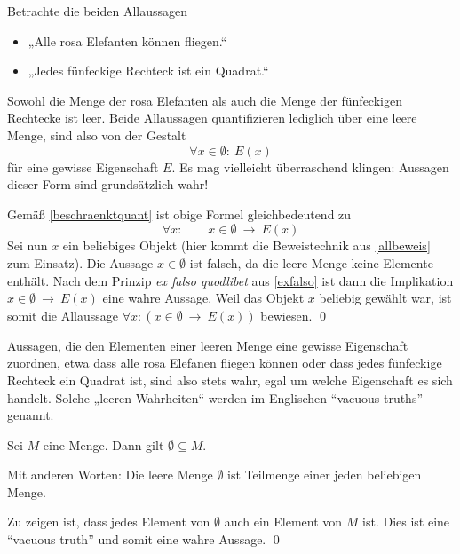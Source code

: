 \begin{bem} \label{vacuoustruth} 
    Betrachte die beiden Allaussagen
    \begin{itemize}
        \item „Alle rosa Elefanten können fliegen.“
        \item „Jedes fünfeckige Rechteck ist ein Quadrat.“
    \end{itemize}	
    Sowohl die Menge der rosa Elefanten als auch die Menge der fünfeckigen Rechtecke ist leer. Beide Allaussagen quantifizieren lediglich über eine leere Menge, sind also von der Gestalt
        \[ \forall x\in \emptyset:\ E(x) \]
    für eine gewisse Eigenschaft $E$. Es mag vielleicht überraschend klingen: Aussagen dieser Form sind grundsätzlich wahr!
    \begin{bew}
        Gemäß \cref{beschraenktquant} ist obige Formel gleichbedeutend zu
            \[ \forall x:\qquad x\in \emptyset\ \to\ E(x) \]
        Sei nun $x$ ein beliebiges Objekt (hier kommt die Beweistechnik aus \cref{allbeweis} zum Einsatz). Die Aussage $x\in\emptyset$ ist falsch, da die leere Menge keine Elemente enthält. Nach dem Prinzip \emph{ex falso quodlibet} aus \cref{exfalso} ist dann die Implikation $x\in \emptyset\ \to\ E(x)$ eine wahre Aussage. Weil das Objekt $x$ beliebig gewählt war, ist somit die Allaussage $\forall x: \left(x\in \emptyset\ \to\ E(x)\right)$ bewiesen. \qed
	\end{bew}
    \noindent Aussagen, die den Elementen einer leeren Menge eine gewisse Eigenschaft zuordnen, etwa dass alle rosa Elefanen fliegen können oder dass jedes fünfeckige Rechteck ein Quadrat ist, sind also stets wahr, egal um welche Eigenschaft es sich handelt. Solche „leeren Wahrheiten“ werden im Englischen ``vacuous truths'' genannt.
\end{bem}


\begin{satz} \label{leeremengeimmerdrin}
    Sei $M$ eine Menge. Dann gilt $\emptyset\subseteq M$.

    Mit anderen Worten: Die leere Menge $\emptyset$ ist Teilmenge einer jeden beliebigen Menge.
\end{satz}


\begin{bew}
    Zu zeigen ist, dass jedes Element von $\emptyset$ auch ein Element von $M$ ist. Dies ist eine ``vacuous truth'' und somit eine wahre Aussage. \qed
\end{bew}





